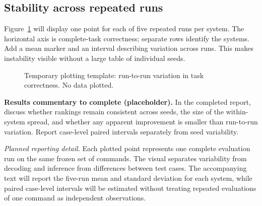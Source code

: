 \documentclass[10pt,conference]{IEEEtran}
\begin{document}
\subsection{Stability across repeated runs}
Figure~\ref{fig:runvariation} will display one point for each of five repeated runs per system. The horizontal axis is complete-task correctness; separate rows identify the systems. Add a mean marker and an interval describing variation across runs. This makes instability visible without a large table of individual seeds.
\begin{figure}[!tbp]
\centering
{}
\caption{Temporary plotting template: run-to-run variation in task correctness. No data plotted.}
\label{fig:runvariation}
\end{figure}
\noindent\textbf{Results commentary to complete (placeholder).}  In the completed report, discuss whether rankings remain consistent across seeds, the size of the within-system spread, and whether any apparent improvement is smaller than run-to-run variation. Report case-level paired intervals separately from seed variability.

\noindent\textit{Planned reporting detail.} Each plotted point represents one complete evaluation run on the same frozen set of commands. The visual separates variability from decoding and inference from differences between test cases. The accompanying text will report the five-run mean and standard deviation for each system, while paired case-level intervals will be estimated without treating repeated evaluations of one command as independent observations.

\FloatBarrier
\end{document}
